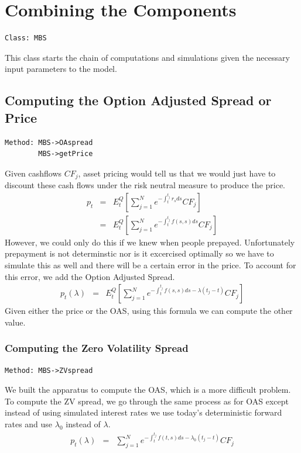 \documentclass[10pt,letterpaper]{article}
\begin{document}
\section{Combining the Components}
\begin{verbatim}Class: MBS \end{verbatim}
This class starts the chain of computations and simulations given the necessary input parameters to the model.
\subsection{Computing the Option Adjusted Spread or Price}
\begin{verbatim}Method: MBS->OAspread 
        MBS->getPrice \end{verbatim}
Given cashflows $CF_j$, asset pricing would tell us that we would just have to discount these cash flows under the risk neutral measure to produce the price.
\begin{eqnarray}
p_t & = & E_t^Q \left[ \sum_{j=1}^N e^{-\int_t^{t_j} r_s ds }CF_j \right] \\
& = & E_t^Q \left[ \sum_{j=1}^N e^{-\int_t^{t_j} f(s,s) ds }CF_j \right]
\end{eqnarray}
However, we could only do this if we knew when people prepayed. Unfortunately prepayment is not determinstic nor is it excercised optimally so we have to simulate this as well and there will be a certain error in the price. To account for this error, we add the Option Adjusted Spread.
\begin{eqnarray}
p_t(\lambda) & = & E_t^Q \left[ \sum_{j=1}^N e^{-\int_t^{t_j} f(s,s) ds - \lambda (t_j - t)}CF_j \right]
\end{eqnarray}
Given either the price or the OAS, using this formula we can compute the other value. 
\subsubsection{Computing the Zero Volatility Spread}
\begin{verbatim}Method: MBS->ZVspread \end{verbatim}
We built the apparatus to compute the OAS, which is a more difficult problem. To compute the ZV spread, we go through the same process as for OAS except instead of using simulated interest rates we use today's deterministic forward rates and use $\lambda_0$ instead of $\lambda$.
\begin{eqnarray}
p_t(\lambda) & = & \sum_{j=1}^N e^{-\int_t^{t_j} f(t,s) ds - \lambda_0 (t_j - t)}CF_j
\end{eqnarray}
\end{document}

